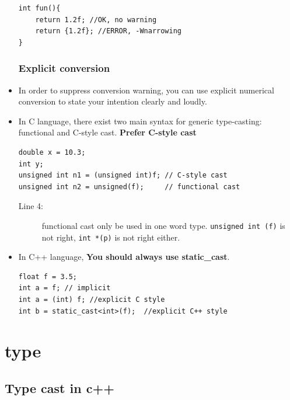 \documentclass[a4paper,11pt,twoside]{book}
\begin{document}
\begin{itemize}
\begin{lstlisting}[numbers=none]
int fun(){
	return 1.2f; //OK, no warning
	return {1.2f}; //ERROR, -Wnarrowing
}
\end{lstlisting}

\subsubsection{Explicit conversion}
	
	\item In order to suppress conversion warning, you can use explicit numerical conversion to state your intention clearly and loudly.
	
	\item In C language, there exist two main syntax for generic type-casting: functional and C-style cast.  \textbf{Prefer C-style cast}
	
\begin{lstlisting}[numbers=none]
double x = 10.3;
int y;
unsigned int n1 = (unsigned int)f; // C-style cast
unsigned int n2 = unsigned(f);     // functional cast
\end{lstlisting}
	\begin{description}
		\item[Line 4:] functional cast only be used in one word type. \texttt{unsigned int (f)} is not right, \texttt{int *(p)} is not right either.
	\end{description}
	
	\item In C++ language, \textbf{You should always use static\_cast}. 
\begin{lstlisting}[numbers=none]
float f = 3.5; 
int a = f; // implicit 
int a = (int) f; //explicit C style
int b = static_cast<int>(f);  //explicit C++ style
\end{lstlisting}

\end{itemize}



\section{type}

\subsection{Type cast in c++}
\end{document}
